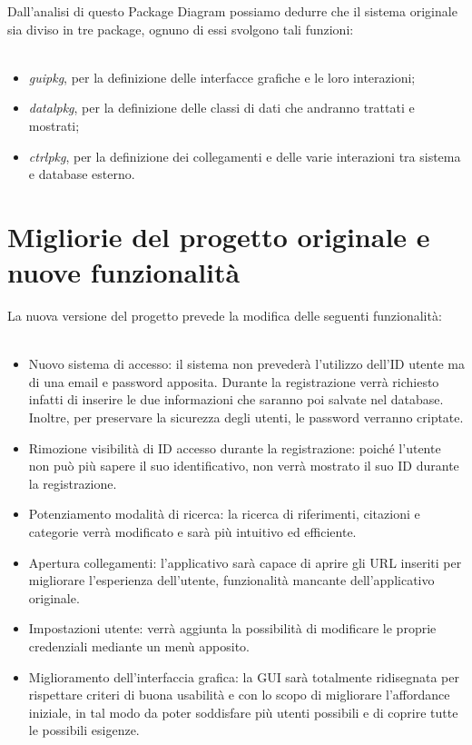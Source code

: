 Dall'analisi di questo Package Diagram possiamo dedurre che il sistema originale sia diviso in tre package, ognuno di essi svolgono tali funzioni: \\~\\
\begin{itemize}
    \item \textit{guipkg}, per la definizione delle interfacce grafiche e le loro interazioni; \\ 
    \item \textit{datalpkg}, per la definizione delle classi di dati che andranno trattati e mostrati;\\
    \item \textit{ctrlpkg}, per la definizione dei collegamenti e delle varie interazioni tra sistema e database esterno.
\end{itemize}
\newpage
\raggedright{\section{Migliorie del progetto originale e nuove funzionalità}}
La nuova versione del progetto prevede la modifica delle seguenti funzionalità: \\~\\
\begin{itemize}
    \item \label{nuovo:accesso} Nuovo sistema di accesso: il sistema non prevederà l'utilizzo dell'ID utente ma di una email e password apposita. Durante la registrazione verrà richiesto infatti di inserire le due informazioni che saranno poi salvate nel database. Inoltre, per preservare la sicurezza degli utenti, le password verranno criptate.
    \item Rimozione visibilità di ID accesso durante la registrazione: poiché l'utente non può più sapere il suo identificativo, non verrà mostrato il suo ID durante la registrazione.
    \item Potenziamento modalità di ricerca: la ricerca di riferimenti, citazioni e categorie verrà modificato e sarà più intuitivo ed efficiente.
    \item Apertura collegamenti: l'applicativo sarà capace di aprire gli URL inseriti per migliorare l'esperienza dell'utente, funzionalità mancante dell'applicativo originale.
    \item Impostazioni utente: verrà aggiunta la possibilità di modificare le proprie credenziali mediante un menù apposito.
    \item Miglioramento dell'interfaccia grafica: la GUI sarà totalmente ridisegnata per rispettare criteri di buona usabilità e con lo scopo di migliorare l'affordance iniziale, in tal modo da poter soddisfare più utenti possibili e di coprire tutte le possibili esigenze.
\end{itemize}
